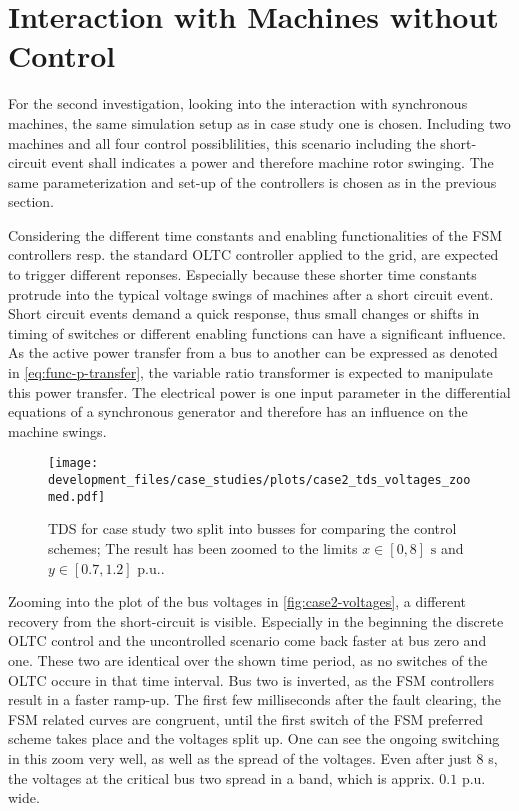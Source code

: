 \section{Interaction with Machines without Control}
\label{sec:case-2}

For the second investigation, looking into the interaction with synchronous machines, the same simulation setup as in case study one is chosen.
Including two machines and all four control possiblilities, this scenario including the short-circuit event shall indicates a power and therefore machine rotor swinging.
The same parameterization and set-up of the controllers is chosen as in the previous section.

Considering the different time constants and enabling functionalities of the \acs{FSM} controllers resp. the standard \acs{OLTC} controller applied to the grid, are expected to trigger different reponses.
Especially because these shorter time constants protrude into the typical voltage swings of machines after a short circuit event.
Short circuit events demand a quick response, thus small changes or shifts in timing of switches or different enabling functions can have a significant influence.
As the active power transfer from a bus to another can be expressed as denoted in \autoref{eq:func-p-transfer}, the variable ratio transformer is expected to manipulate this power transfer.
The electrical power is one input parameter in the differential equations of a synchronous generator \autocite{machowski_2020,kundur_2022} and therefore has an influence on the machine swings.

\begin{figure}[htb!]
    \centering
    \texttt{[image: development\_files/case\_studies/plots/case2\_tds\_voltages\_zoomed.pdf]}
    \caption[\acs{TDS} for case study two split into busses for comparing the control schemes]{\acs{TDS} for case study two split into busses for comparing the control schemes; The result has been zoomed to the limits $x \in [0,8]\text{ s}$ and $y \in [0.7,1.2]\text{ p.u.}$.}
    \label{fig:case2-voltages}
\end{figure}

Zooming into the plot of the bus voltages in \autoref{fig:case2-voltages}, a different recovery from the short-circuit is visible.
Especially in the beginning the discrete \acs{OLTC} control and the uncontrolled scenario come back faster at bus zero and one.
These two are identical over the shown time period, as no switches of the \acs{OLTC} occure in that time interval.
Bus two is inverted, as the \acs{FSM} controllers result in a faster ramp-up.
The first few milliseconds after the fault clearing, the \acs{FSM} related curves are congruent, until the first switch of the \acs{FSM} preferred scheme takes place and the voltages split up.
One can see the ongoing switching in this zoom very well, as well as the spread of the voltages.
Even after just $8$ s, the voltages at the critical bus two spread in a band, which is apprix. $0.1$ p.u. wide.

